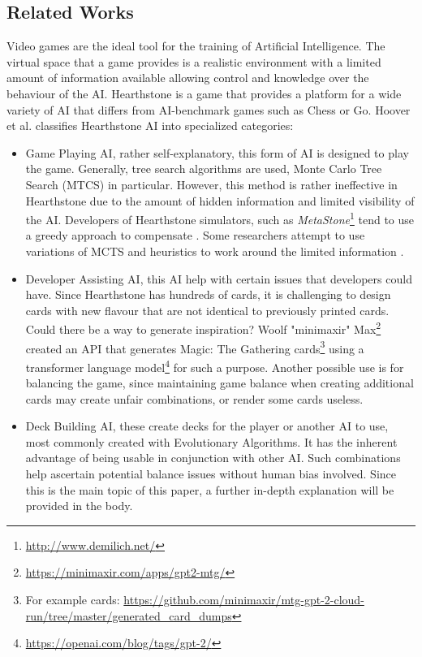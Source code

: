 \documentclass{report} %
\begin{document}
\subsection{Related Works}
	Video games are the ideal tool for the training of Artificial Intelligence. The virtual space that a game provides is a realistic environment with a limited amount of information available \cite{Sweetser2002} allowing control and knowledge over the behaviour of the AI. Hearthstone is a game that provides a platform for a wide variety of AI that differs from AI-benchmark games such as Chess or Go. Hoover et al. \cite{Hoover2020} classifies Hearthstone AI into specialized categories: 
\begin{itemize}
\item Game Playing AI, rather self-explanatory, this form of AI is designed to play the game. Generally, tree search algorithms are used, Monte Carlo Tree Search (MTCS) in particular. However, this method is rather ineffective in Hearthstone due to the amount of hidden information and limited visibility of the AI. Developers of Hearthstone simulators, such as {\it{MetaStone}}\footnote{\url{http://www.demilich.net/}} tend to use a greedy approach to compensate \cite{Yannakakis2018}. Some researchers attempt to use variations of MCTS and heuristics to work around the limited information \cite{Janusz2017}\cite{Santos2017}\cite{Swiechowski2018}.
\item Developer Assisting AI, this AI help with certain issues that developers could have. Since Hearthstone has hundreds of cards, it is challenging to design cards with new flavour that are not identical to previously printed cards. Could there be a way to generate inspiration? Woolf "minimaxir" Max\footnote{\url{https://minimaxir.com/apps/gpt2-mtg/}} created an API that generates Magic: The Gathering cards\footnote{For example cards: \url{https://github.com/minimaxir/mtg-gpt-2-cloud-run/tree/master/generated_card_dumps}} using a transformer language model\footnote{\url{https://openai.com/blog/tags/gpt-2/}} for such a purpose. Another possible use is for balancing the game, since maintaining game balance when creating additional cards may create unfair combinations, or render some cards useless\cite{EvolveMeta}.
\item Deck Building AI, these create decks for the player or another AI to use, most commonly created with Evolutionary Algorithms\cite{Back1996}. It has the inherent advantage of being usable in conjunction with other AI. Such combinations help ascertain potential balance issues without human bias involved. Since this is the main topic of this paper, a further in-depth explanation will be provided in the body. 
\end{itemize}
\end{document}
